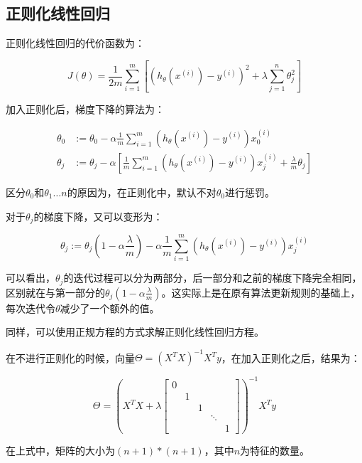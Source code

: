 \documentclass[12pt, a4paper]{article}
\begin{document}
\subsection{正则化线性回归}

正则化线性回归的代价函数为：

\begin{equation*}
    J(\theta)=\frac{1}{2m}\sum_{i=1}^{m}\left[\left(h_\theta(x^{(i)})-y^{(i)}\right)^2+\lambda\sum_{j=1}^{n}\theta_j^2\right]
\end{equation*}

加入正则化后，梯度下降的算法为：

\begin{align*}
    \theta_0 & :=\theta_0-\alpha\frac{1}{m}\sum_{i=1}^{m}(h_\theta(x^{(i)})-y^{(i)})x_0^{(i)}                                        \\
    \theta_j & :=\theta_j-\alpha\left[\frac{1}{m}\sum_{i=1}^{m}(h_\theta(x^{(i)})-y^{(i)})x_j^{(i)}+\frac{\lambda}{m}\theta_j\right]
\end{align*}

区分$\theta_0$和$\theta_1\dots n$的原因为，在正则化中，默认不对$\theta_0$进行惩罚。

对于$\theta_j$的梯度下降，又可以变形为：

\begin{equation*}
    \theta_j:=\theta_j(1-\alpha\frac{\lambda}{m})-\alpha\frac{1}{m}\sum_{i=1}^{m}(h_\theta(x^{(i)})-y^{(i)})x_j^{(i)}
\end{equation*}

可以看出，$\theta_j$的迭代过程可以分为两部分，后一部分和之前的梯度下降完全相同，区别就在与第一部分的$\theta_j(1-\alpha\frac{\lambda}{m})$。这实际上是在原有算法更新规则的基础上，每次迭代令$\theta$减少了一个额外的值。

同样，可以使用正规方程的方式求解正则化线性回归方程。

在不进行正则化的时候，向量$\Theta=(X^TX)^{-1}X^Ty$，在加入正则化之后，结果为：

\begin{equation*}
    \Theta=\left(X^TX+\lambda\begin{bmatrix}0 & & & &\\ & 1 & & &\\ & & 1 & &\\ & & & \ddots & \\ & & & & 1\end{bmatrix}\right)^{-1}X^Ty
\end{equation*}

在上式中，矩阵的大小为$(n+1)*(n+1)$，其中$n$为特征的数量。
\end{document}
